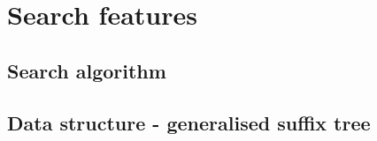 \chapter{Search features}

\section{Search algorithm}

\section{Data structure - generalised suffix tree}
